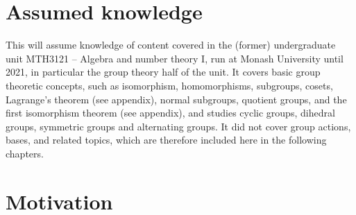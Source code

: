 \section{Assumed knowledge}

This \thesis{} will assume knowledge of content covered in the (former) undergraduate unit MTH3121 -- Algebra and number theory I, run at Monash University until 2021, in particular the group theory half of the unit. It covers basic group theoretic concepts, such as isomorphism, homomorphisms, subgroups, cosets, Lagrange's theorem (see appendix), normal subgroups, quotient groups, and the first isomorphism theorem (see appendix), and studies cyclic groups, dihedral groups, symmetric groups and alternating groups. It did not cover group actions, bases, and related topics, which are therefore included here in the following chapters.

\section{Motivation}

